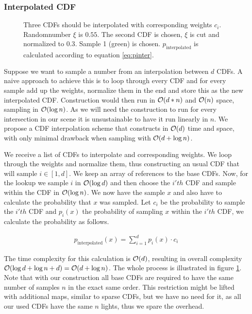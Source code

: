 \subsubsection{Interpolated CDF}
\label{sec:intcdf}
\begin{figure}[htb] 
	\centering
    
    \caption{Three CDFs should be interpolated with corresponding weights $c_i$. Randomnumber $\xi$ is $0.55$. The second CDF is chosen, $\xi$ is cut and normalized to $0.3$. Sample 1 (green) is chosen. $p_{\text{interpolated}}$ is calculated according to equation \ref{eq:pinter}.} 
    \label{fig:interpolatedCDF}
\end{figure}

Suppose we want to sample a number from an interpolation between $d$ CDFs. A naive approach to achieve this is to loop through every CDF and for every sample add up the weights, normalize them in the end and store this as the new interpolated CDF. Construction would then run in $\mathcal{O}(d * n)$ and $\mathcal{O}(n)$ space, sampling in $\mathcal{O}(\log{n})$. As we will need the construction to run for every intersection in our scene it is unsustainable to have it run linearly in $n$. We propose a CDF interpolation scheme that constructs in $\mathcal{O}(d)$ time and space, with only minimal drawback when sampling with $\mathcal{O}(d + \log{n})$.

We receive a list of CDFs to interpolate and corresponding weights. We loop through the weights and normalize them, thus constructing an usual CDF that will sample $i \in [1,d]$. We keep an array of references to the base CDFs. Now, for the lookup we sample $i$ in $\mathcal{O}(\log{d})$ and then choose the $i'th$ CDF and sample within the CDF in $\mathcal{O}(\log{n})$. We now have the sample $x$ and also have to calculate the probability that $x$ was sampled. Let $c_i$ be the probability to sample the $i'th$ CDF and $p_i(x)$ the probability of sampling $x$ within the $i'th$ CDF, we calculate the probability as follows.

\begin{align}\label{eq:pinter}
    p_{\text{interpolated}}(x) = \sum_{i=1}^{d}p_{i}(x) \cdot c_i
\end{align}

The time complexity for this calculation is $\mathcal{O}(d)$, resulting in overall complexity $\mathcal{O}(\log{d} + \log{n} + d) = \mathcal{O}(d + \log{n})$. The whole process is illustrated in figure \ref{fig:interpolatedCDF}. Note that with our construction all base CDFs are required to have the same number of samples $n$ in the exact same order. This restriction might be lifted with additional maps, similar to sparse CDFs, but we have no need for it, as all our used CDFs have the same $n$ lights, thus we spare the overhead.

